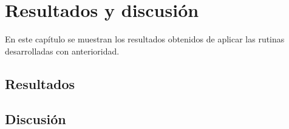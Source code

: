 \chapter{Resultados y discusión}

En este capítulo se muestran los resultados obtenidos de aplicar las rutinas desarrolladas con anterioridad.


\section{Resultados}


\section{Discusión}